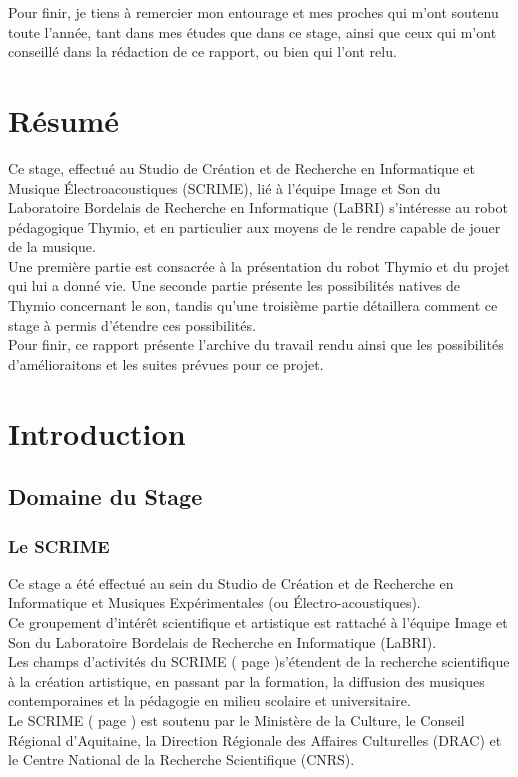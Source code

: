 \documentclass[a4paper, 12pt]{report}
\begin{document}
Pour finir, je tiens à remercier mon entourage et mes proches qui m'ont soutenu toute l'année, tant dans mes études que dans ce stage, ainsi que ceux qui m'ont conseillé dans la rédaction de ce rapport, ou bien qui l'ont relu.

\chapter*{Résumé}
	Ce stage, effectué au Studio de Création et de Recherche en Informatique et Musique Électroacoustiques (SCRIME), lié à l'équipe Image et Son du Laboratoire Bordelais de Recherche en Informatique (LaBRI) s'intéresse au robot pédagogique Thymio, et en particulier aux moyens de le rendre capable de jouer de la musique.\\
Une première partie est consacrée à la présentation du robot Thymio et du projet qui lui a donné vie. Une seconde partie présente les possibilités natives de Thymio concernant le son, tandis qu'une troisième partie détaillera comment ce stage à permis d'étendre ces possibilités.\\
Pour finir, ce rapport présente l'archive du travail rendu ainsi que les possibilités d'amélioraitons et les suites prévues pour ce projet.

\tableofcontents %

\chapter{Introduction}
\section{Domaine du Stage}
\subsection{Le SCRIME}
\label{SCRIME}
Ce stage a été effectué au sein du Studio de Création et de Recherche en Informatique et Musiques Expérimentales (ou Électro-acoustiques).\cite{SCRIME2016}\\
Ce groupement d'intérêt scientifique et artistique est rattaché à l'équipe Image et Son du Laboratoire Bordelais de Recherche en Informatique (LaBRI).\\
Les champs d'activités du SCRIME ( page \pageref{SCRIME} )s'étendent de la recherche scientifique à la création artistique, en passant par la formation, la diffusion des musiques contemporaines et la pédagogie en milieu scolaire et universitaire. \\
Le SCRIME ( page \pageref{SCRIME} ) est soutenu par le Ministère de la Culture, le Conseil Régional d'Aquitaine, la Direction Régionale des Affaires Culturelles (DRAC) et le Centre National de la Recherche Scientifique (CNRS).\\
\end{document}
